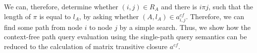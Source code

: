We can, therefore, determine whether $(i,j) \in R_A$ and there is $i \pi j$, such that the length of $\pi$ is equal to $l_A$, by asking whether $(A, l_A) \in a^{cf}_{i,j}$. Therefore, we can find some path from node $i$ to node $j$ by a simple search. Thus, we show how the context-free path query evaluation using the single-path query semantics can be reduced to the calculation of matrix transitive closure $a^{cf}$.
